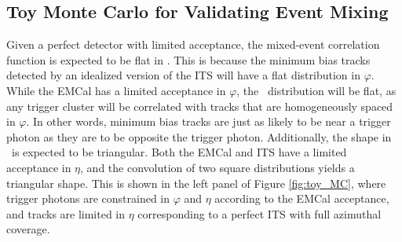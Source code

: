 \subsection{Toy Monte Carlo for Validating Event Mixing}
\label{sec:ToyMC_Mixing}
Given a perfect detector with limited acceptance, the mixed-event correlation function is expected to be flat in \deltaphi. This is because the minimum bias tracks detected by an idealized version of the ITS will have a flat distribution in $\varphi$. While the EMCal has a limited acceptance in $\varphi$, the \deltaphi~distribution will be flat, as any trigger cluster will be correlated with tracks that are homogeneously spaced in $\varphi$. In other words, minimum bias tracks are just as likely to be near a trigger photon as they are to be opposite the trigger photon. Additionally, the shape in \deltaeta~is expected to be triangular. Both the EMCal and ITS have a limited acceptance in $\eta$, and the convolution of two square distributions yields a triangular shape. This is shown in the left panel of Figure \ref{fig:toy_MC}, where trigger photons are constrained in $\varphi$ and $\eta$ according to the EMCal acceptance, and tracks are limited in $\eta$ corresponding to a perfect ITS with full azimuthal coverage.  

